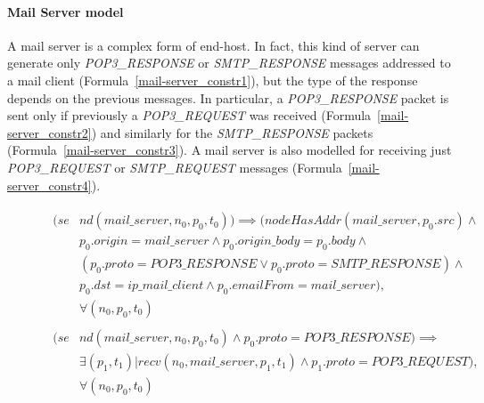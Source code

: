 \paragraph{Mail Server model} A mail server is a complex form of end-host. In fact, this kind of server can generate only \textit{POP3\_RESPONSE} or \textit{SMTP\_RESPONSE} messages addressed to a mail client (Formula~\ref{mail-server_constr1}), but the type of the response depends on the previous messages. In particular, a \textit{POP3\_RESPONSE} packet is sent only if previously a \textit{POP3\_REQUEST} was received (Formula~\ref{mail-server_constr2}) and similarly for the \textit{SMTP\_RESPONSE} packets (Formula~\ref{mail-server_constr3}). A mail server is also modelled for receiving just \textit{POP3\_REQUEST} or \textit{SMTP\_REQUEST} messages (Formula~\ref{mail-server_constr4}). 
\begin{figure}[h]
	{\footnotesize
		\begin{subequations}
			\begin{align}
				\begin{split}
					\label{mail-server_constr1}
					(se& nd(mail\_server , n_{0}, p_{0}, t_{0})) \implies (nodeHasAddr(mail\_server, p_{0}.src) \wedge \\
					& p_{0}.origin = mail\_server \wedge p_{0}.origin\_body = p_{0}.body \wedge \\
					& (p_{0}.proto = POP3\_RESPONSE \vee p_{0}.proto = SMTP\_RESPONSE) \wedge \\
					& p_{0}.dst = ip\_mail\_client \wedge p_{0}.emailFrom = mail\_server), \\
					& \forall (n_{0}, p_{0}, t_{0})
				\end{split} \\
				\begin{split}
					\label{mail-server_constr2}
					(se& nd(mail\_server , n_{0}, p_{0}, t_{0}) \wedge p_{0}.proto = POP3\_RESPONSE) \implies \\
					& \exists (p_{1}, t_{1}) | recv(n_{0}, mail\_server, p_{1}, t_{1})  \wedge p_{1}.proto = POP3\_REQUEST),\\
					& \forall (n_{0}, p_{0}, t_{0})
				\end{split} \\

\end{align}
\end{subequations}}
\end{figure}
